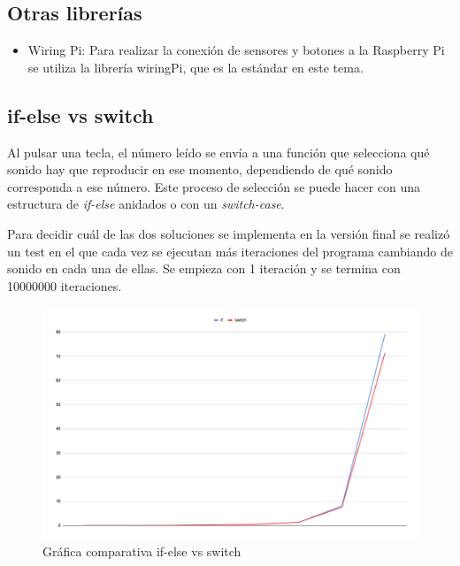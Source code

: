 
        \subsection{Otras librerías} %
        \label{sub:OtrasLibrerias}

            \begin{itemize}
                \item
                Wiring Pi\cite{wiringPi}: Para realizar la conexión de sensores y botones a la Raspberry Pi se utiliza
                la librería wiringPi, que es la estándar en este tema.
            \end{itemize}


        \subsection{if-else vs switch} %
        \label{sub:if-else_vs_switch}

            Al pulsar una tecla, el número leído se envía a una función que selecciona qué sonido hay que reproducir en
            ese momento, dependiendo de qué sonido corresponda a ese número. Este proceso de selección se puede hacer
            con una estructura de \textit{if-else} anidados o con un \textit{switch-case}.\newline

            Para decidir cuál de las dos soluciones se implementa en la versión final se realizó un test en el que cada
            vez se ejecutan más iteraciones del programa cambiando de sonido en cada una de ellas. Se empieza con 1
            iteración y se termina con 10000000 iteraciones.\newline

            \begin{figure}[ht]
                \centering
                \includegraphics[width=\textwidth]{grafica_if_switch}
                \caption{Gráfica comparativa if-else vs switch \label{fig:GraficaIfVsSwitch}}
            \end{figure}

